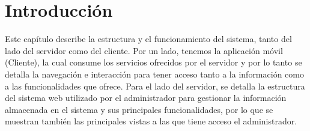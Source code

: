 \section{Introducción}
Este capítulo describe la estructura y el funcionamiento del sistema, tanto del lado del servidor como del cliente. Por un lado, tenemos la aplicación móvil (Cliente), la cual consume los servicios ofrecidos por el servidor y por lo tanto se detalla la navegación e interacción para tener acceso tanto a la información como a las funcionalidades que ofrece.
Para el lado del servidor, se detalla la estructura del sistema web utilizado por el administrador para gestionar la información almacenada en el sistema y sus principales funcionalidades, por lo que se muestran también las principales vistas a las que tiene acceso el administrador.
